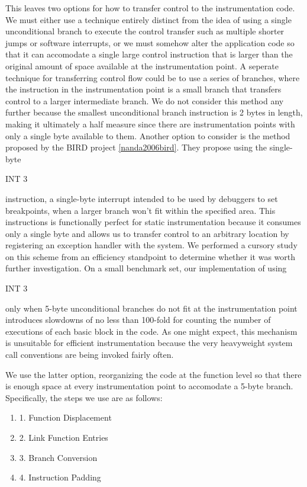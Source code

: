 This leaves two options for how to transfer control to the instrumentation code.
We must either use a technique entirely distinct from the idea of using a single
unconditional branch to execute the control transfer such as multiple shorter
jumps or software interrupts, or we must somehow alter the application code so
that it can accomodate a single large control instruction that is larger than
the original amount of space available at the instrumentation point. A seperate
technique for transferring control flow could be to use a series of branches,
where the instruction in the instrumentation point is a small branch that
transfers control to a larger intermediate branch. We do not consider this
method any further because the smallest unconditional branch instruction is 2
bytes in length, making it ultimately a half measure since there are
instrumentation points with only a single byte available to them. Another option
to consider is the method proposed by the BIRD project \ref{nanda2006bird}. They
propose using the single-byte \begin{it}INT 3\end{it} instruction, a single-byte
interrupt intended to be used by debuggers to set breakpoints, when a larger
branch won't fit within the specified area. This instructions is functionally
perfect for static instrumentation because it consumes only a single byte and
allows us to transfer control to an arbitrary location by registering an
exception handler with the system. We performed a cursory study on this scheme
from an efficiency standpoint to determine whether it was worth further
investigation. On a small benchmark set, our implementation of using
\begin{it}INT 3\end{it} only when 5-byte unconditional branches do not fit at
the instrumentation point introduces slowdowns of no less than 100-fold for
counting the number of executions of each basic block in the code. As one might
expect, this mechanism is unsuitable for efficient instrumentation because the
very heavyweight system call conventions are being invoked fairly often.

We use the latter option, reorganizing the code at the function level so that
there is enough space at every instrumentation point to accomodate a 5-byte
branch. Specifically, the steps we use are as follows:
\begin{enumerate}
\item 
1. Function Displacement
\item
2. Link Function Entries 
\item
3. Branch Conversion
\item
4. Instruction Padding
\end{enumerate}


